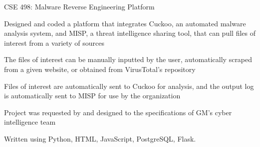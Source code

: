 
\begin{cventries}
  \cventry
    {} %
    {CSE 498: Malware Reverse Engineering Platform} %
    {} %
    {} %
    {
      \begin{cvitems} %
		\item {Designed and coded a platform that integrates Cuckoo, an automated malware analysis system, and MISP, a threat intelligence sharing tool, that can pull files of interest from a variety of sources}
		\item {The files of interest can be manually inputted by the user, automatically scraped from a given website, or obtained from VirusTotal's repository}
		\item {Files of interest are automatically sent to Cuckoo for analysis, and the output log is automatically sent to MISP for use by the organization}
		\item {Project was requested by and designed to the specifications of GM's cyber intelligence team}
        \item {Written using Python, HTML, JavaScript, PostgreSQL, Flask.}
      \end{cvitems}
    }
\end{cventries}

